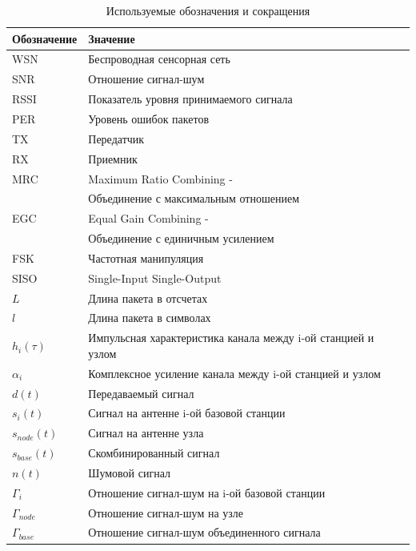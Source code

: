 \documentclass[a4paper,12pt,oneside]{scrartcl}
\begin{document}
\begin{table}[!htb]
\centering
\caption{Используемые обозначения и сокращения}
\label{designations}
    \begin{tabular}{|l|l|}
    \hline
    Обозначение & Значение \\ \hline
    WSN & Беспроводная сенсорная сеть \\
    SNR & Отношение сигнал-шум \\
    RSSI & Показатель уровня принимаемого сигнала \\
    PER & Уровень ошибок пакетов \\
    TX & Передатчик \\
    RX & Приемник \\
    MRC & Maximum Ratio Combining - \\
    & Объединение с максимальным отношением\\
    EGC & Equal Gain Combining -\\
    & Объединение с единичным усилением\\
    FSK & Частотная манипуляция \\
    SISO & Single-Input Single-Output\\
    $L$ & Длина пакета в отсчетах \\
    $l$ & Длина пакета в символах \\
    $h_i(\tau)$ & Импульсная характеристика канала между i-ой станцией и узлом\\
    $\alpha_i$ & Комплексное усиление канала между i-ой станцией и узлом\\
	$d(t)$ & Передаваемый сигнал \\	
	$s_i(t)$ & Сигнал на антенне i-ой базовой станции \\
	$s_{node}(t)$ & Сигнал на антенне узла \\
	$s_{base}(t)$ & Скомбинированный сигнал \\
	$n(t)$ & Шумовой сигнал \\
	$\Gamma_i$ & Отношение сигнал-шум на i-ой базовой станции \\
	$\Gamma_{node}$ & Отношение сигнал-шум на узле \\
	$\Gamma_{base}$ & Отношение сигнал-шум объединенного сигнала \\
    \hline
    \end{tabular}
\end{table}
\cleardoublepage
\end{document}
